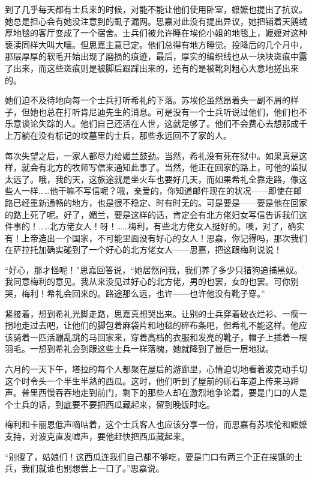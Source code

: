 \par 到了几乎每天都有士兵来的时候，对能不能让他们使用卧室，嬷嬷也提出了抗议。她总是担心会有她没注意到的虱子漏网。思嘉对此没有提出异议，她把铺着天鹅绒厚地毯的客厅变成了一个宿舍。士兵们被允许睡在埃伦小姐的地毯上，嬷嬷对这种亵渎同样大叫大嚷。但思嘉主意已定。他们总得有地方睡觉。投降后的几个月中，那层厚厚的软毛开始出现了磨损的痕迹，最后，厚实的编织线也从一块块斑痕中露了出来，而这些斑痕则是被脚后跟踩出来的，还有的是被靴刺粗心大意地搓出来的。
\par 她们迫不及待地向每一个士兵打听希礼的下落。苏埃伦虽然昂着头一副不屑的样子，但她也总在打听肯尼迪先生的消息。可是没有一个士兵听说过他们，他们也不乐意谈论失踪的人。他们自己还活在人世，这就足够了。他们不会费心去想那成千上万躺在没有标记的坟墓里的士兵，那些永远回不了家的人。
\par 每次失望之后，一家人都尽力给媚兰鼓劲。当然，希礼没有死在狱中。如果真是这样，就会有北方的牧师写信来通知此事了。当然，他正在回家的路上，可他的监狱太远了。哦，我的天，这旅途就是坐火车也要好几天，而如果希礼全靠走路，像这些人一样……他干嘛不写信呢？哦，亲爱的，你知道邮件现在的状况——即使在邮路已经重新通畅的地方，也是很不稳定、时有时无的。可是要是——要是他在回家的路上死了呢。好了，媚兰，要是这样的话，肯定会有北方佬妇女写信告诉我们这件事的！……北方佬女人！呀！……梅利，有些北方佬女人挺好的。噢，对了，确实有！上帝造出一个国家，不可能里面没有好心的女人！思嘉，你记得吗，那次我们在萨拉托加确实碰到了一个好心的北方佬女人——思嘉，把这跟梅利说说！
\par “好心，那才怪呢！”思嘉回答说，“她居然问我，我们养了多少只猎狗追捕黑奴。我同意梅利的意见。我从来没见过好心的北方佬，男的也罢，女的也罢。可你别哭，梅利！希礼会回来的。路途那么远，也许——也许他没有靴子穿。”
\par 紧接着，想到希礼光脚走路，思嘉真想哭出来。让别的士兵穿着破衣烂衫、一瘸一拐地走过去吧，让他们的脚包着麻袋片和地毯的碎布条吧，但希礼不能这样。他应该骑着一匹活蹦乱跳的马回家来，穿着高档的衣服和发亮的靴子，帽子上插着一根羽毛。一想到希礼会到跟这些士兵一样落魄，她就降到了最后一层地狱。
\par 六月的一天下午，塔拉的每个人都聚在屋后的游廊里，心情迫切地看着波克动手切这个时令头一个半生半熟的西瓜。这时，他们听到了屋前的砾石车道上传来马蹄声。普里西慢吞吞地走到前门，剩下的那些人却在激烈地争论着，要是门口的人是个士兵的话，到底要不要把西瓜藏起来，留到晚饭时吃。
\par 梅利和卡丽恩低声嘀咕着，这个士兵客人也应该分享一份，而思嘉有苏埃伦和嬷嬷支持，对波克直发嘘声，要他赶快把西瓜藏起来。
\par “别傻了，姑娘们！这西瓜连我们自己都不够吃，要是门口有两三个正在挨饿的士兵，我们就谁也别想尝上一口了。”思嘉说。

